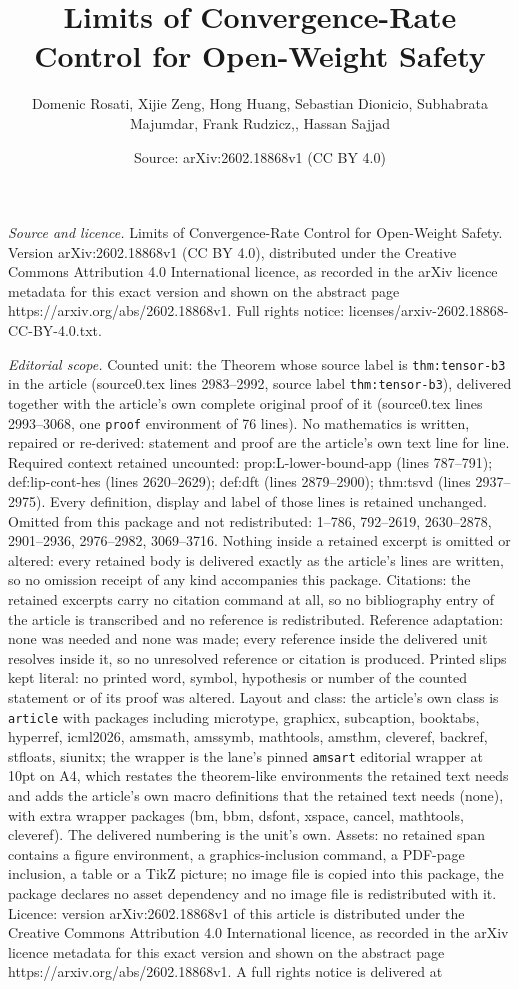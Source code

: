 \documentclass[10pt,a4paper]{amsart}
\title[Limits of Convergence-Rate Control for Open-Weight Safety]{Limits of Convergence-Rate Control for Open-Weight Safety}
\author{Domenic Rosati, Xijie Zeng, Hong Huang, Sebastian Dionicio, Subhabrata Majumdar, Frank Rudzicz,, Hassan Sajjad}
\date{Source: arXiv:2602.18868v1 (CC BY 4.0)}
\begin{document}
\maketitle

\noindent\emph{Source and licence.} Limits of Convergence-Rate Control for Open-Weight Safety. Version arXiv:2602.18868v1 (CC BY 4.0), distributed under the Creative Commons Attribution 4.0 International licence, as recorded in the arXiv licence metadata for this exact version and shown on the abstract page https://arxiv.org/abs/2602.18868v1. Full rights notice: licenses/arxiv-2602.18868-CC-BY-4.0.txt.\par\smallskip

\noindent\textit{Editorial scope.} Counted unit: the Theorem whose source label is \texttt{thm:tensor-b3} in the article (source0.tex lines 2983--2992, source label \texttt{thm:tensor-b3}), delivered together with the article's own complete original proof of it (source0.tex lines 2993--3068, one \texttt{proof} environment of 76 lines). No mathematics is written, repaired or re-derived: statement and proof are the article's own text line for line. Required context retained uncounted: prop:L-lower-bound-app (lines 787--791); def:lip-cont-hes (lines 2620--2629); def:dft (lines 2879--2900); thm:tsvd (lines 2937--2975). Every definition, display and label of those lines is retained unchanged. Omitted from this package and not redistributed: 1--786, 792--2619, 2630--2878, 2901--2936, 2976--2982, 3069--3716. Nothing inside a retained excerpt is omitted or altered: every retained body is delivered exactly as the article's lines are written, so no omission receipt of any kind accompanies this package. Citations: the retained excerpts carry no citation command at all, so no bibliography entry of the article is transcribed and no reference is redistributed. Reference adaptation: none was needed and none was made; every reference inside the delivered unit resolves inside it, so no unresolved reference or citation is produced. Printed slips kept literal: no printed word, symbol, hypothesis or number of the counted statement or of its proof was altered. Layout and class: the article's own class is \texttt{article} with packages including microtype, graphicx, subcaption, booktabs, hyperref, icml2026, amsmath, amssymb, mathtools, amsthm, cleveref, backref, stfloats, siunitx; the wrapper is the lane's pinned \texttt{amsart} editorial wrapper at 10pt on A4, which restates the theorem-like environments the retained text needs and adds the article's own macro definitions that the retained text needs (none), with extra wrapper packages (bm, bbm, dsfont, xspace, cancel, mathtools, cleveref). The delivered numbering is the unit's own. Assets: no retained span contains a figure environment, a graphics-inclusion command, a PDF-page inclusion, a table or a TikZ picture; no image file is copied into this package, the package declares no asset dependency and no image file is redistributed with it. Licence: version arXiv:2602.18868v1 of this article is distributed under the Creative Commons Attribution 4.0 International licence, as recorded in the arXiv licence metadata for this exact version and shown on the abstract page https://arxiv.org/abs/2602.18868v1. A full rights notice is delivered at 
\end{document}
